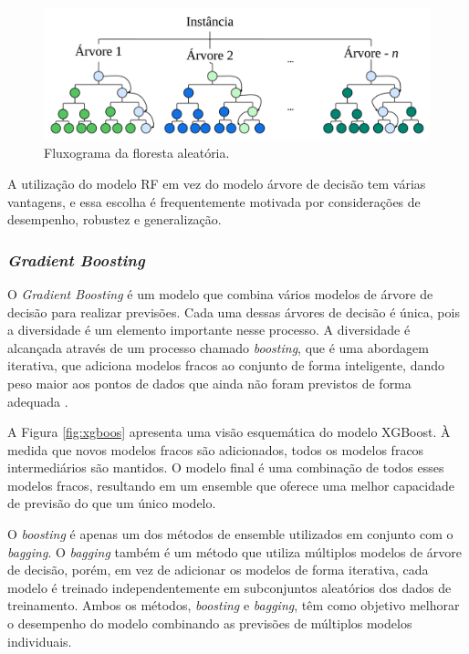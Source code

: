  \begin{figure}[H]
 	\centering
 	\caption{Fluxograma da floresta aleatória.}
 	\label{fig:rf}
 	\includegraphics[width=\linewidth]{Modelos/Figuras/RF.pdf}
 \end{figure}
 
A utilização do modelo RF em vez do modelo árvore de decisão tem várias vantagens, e essa escolha é frequentemente motivada por considerações de desempenho, robustez e generalização.
 
 \subsubsection{\textit{Gradient Boosting}}\label{subsubsec:lgbxgb}
 
 O \textit{Gradient Boosting} é um modelo que combina vários modelos de árvore de decisão para realizar previsões. Cada uma dessas árvores de decisão é única, pois a diversidade é um elemento importante nesse processo. A diversidade é alcançada através de um processo chamado \textit{boosting}, que é uma abordagem iterativa, que adiciona modelos fracos ao conjunto de forma inteligente, dando peso maior aos pontos de dados que ainda não foram previstos de forma adequada \cite{BUEECHI2023109596}. 
 
A Figura \ref{fig:xgboos} apresenta uma visão esquemática do modelo XGBoost. À medida que novos modelos fracos são adicionados, todos os modelos fracos intermediários são mantidos. O modelo final é uma combinação de todos esses modelos fracos, resultando em um ensemble que oferece uma melhor capacidade de previsão do que um único modelo.
 
 O \textit{boosting} é apenas um dos métodos de ensemble utilizados em conjunto com o \textit{bagging}. O \textit{bagging} também é um método que utiliza múltiplos modelos de árvore de decisão, porém, em vez de adicionar os modelos de forma iterativa, cada modelo é treinado independentemente em subconjuntos aleatórios dos dados de treinamento. Ambos os métodos, \textit{boosting} e \textit{bagging}, têm como objetivo melhorar o desempenho do modelo combinando as previsões de múltiplos modelos individuais.
 
